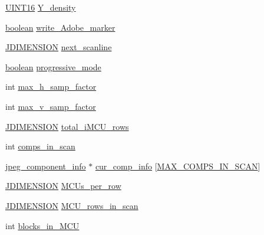 \begin{DoxyCompactItemize}
\item 
\hyperlink{jmorecfg_8h_a805c2c164bdd38d72a30c46e84fb568b}{U\+I\+N\+T16} \hyperlink{structjpeg__compress__struct_a978dc1c187fab34211757a134ebf4adb}{Y\+\_\+density}
\item 
\hyperlink{jconfig_8h_a7670a4e8a07d9ebb00411948b0bbf86d}{boolean} \hyperlink{structjpeg__compress__struct_a39c549a441052b38df2dfd7359c68814}{write\+\_\+\+Adobe\+\_\+marker}
\item 
\hyperlink{jmorecfg_8h_a04ed4674f6f1d0d50ec241531e38274f}{J\+D\+I\+M\+E\+N\+S\+I\+ON} \hyperlink{structjpeg__compress__struct_aefb3f2e6479374ba03e7d0421dcfb086}{next\+\_\+scanline}
\item 
\hyperlink{jconfig_8h_a7670a4e8a07d9ebb00411948b0bbf86d}{boolean} \hyperlink{structjpeg__compress__struct_ae3b16d173e7feef7b6b0e823fd2fde3f}{progressive\+\_\+mode}
\item 
int \hyperlink{structjpeg__compress__struct_ae8de4e6079b80e3a81135d07934c640d}{max\+\_\+h\+\_\+samp\+\_\+factor}
\item 
int \hyperlink{structjpeg__compress__struct_a9e03a4eb7af87c682937caed3d341d4a}{max\+\_\+v\+\_\+samp\+\_\+factor}
\item 
\hyperlink{jmorecfg_8h_a04ed4674f6f1d0d50ec241531e38274f}{J\+D\+I\+M\+E\+N\+S\+I\+ON} \hyperlink{structjpeg__compress__struct_aef01162f4c66434929f933a40e695f9e}{total\+\_\+i\+M\+C\+U\+\_\+rows}
\item 
int \hyperlink{structjpeg__compress__struct_a3387358088abbec1c8838499966c8f06}{comps\+\_\+in\+\_\+scan}
\item 
\hyperlink{structjpeg__component__info}{jpeg\+\_\+component\+\_\+info} $\ast$ \hyperlink{structjpeg__compress__struct_a1cacb367b7d69227d3086ff105bca9ab}{cur\+\_\+comp\+\_\+info} \mbox{[}\hyperlink{jpeglib_8h_adc7013da016c19051dc623fb3d8b35b4}{M\+A\+X\+\_\+\+C\+O\+M\+P\+S\+\_\+\+I\+N\+\_\+\+S\+C\+AN}\mbox{]}
\item 
\hyperlink{jmorecfg_8h_a04ed4674f6f1d0d50ec241531e38274f}{J\+D\+I\+M\+E\+N\+S\+I\+ON} \hyperlink{structjpeg__compress__struct_a97f0c5e0ae932d1810007077443da684}{M\+C\+Us\+\_\+per\+\_\+row}
\item 
\hyperlink{jmorecfg_8h_a04ed4674f6f1d0d50ec241531e38274f}{J\+D\+I\+M\+E\+N\+S\+I\+ON} \hyperlink{structjpeg__compress__struct_ab605396740a26114095bf99c7c7349fb}{M\+C\+U\+\_\+rows\+\_\+in\+\_\+scan}
\item 
int \hyperlink{structjpeg__compress__struct_ac32cf016a916984f68f158e5310a16bb}{blocks\+\_\+in\+\_\+\+M\+CU}
\item 

\end{DoxyCompactItemize}

